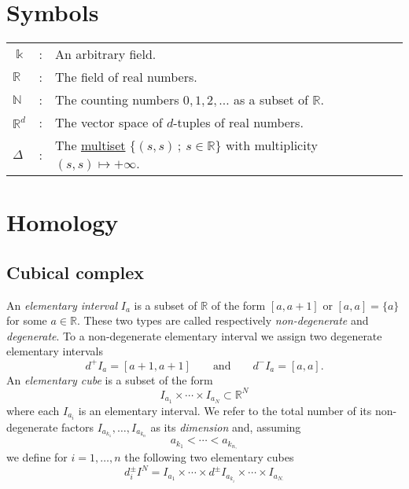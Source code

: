 \documentclass{amsart}
\begin{document}
	
	\section{Symbols}	
	
	\begin{tabular}{ l l l}
		$\Bbbk$ & : & An arbitrary field. \\
		$\mathbb R$ & : & The field of real numbers. \\
		$\mathbb N$ & : & The counting numbers $0,1,2, \ldots$ as a subset of $\mathbb R$. \\
		$\mathbb R^d$ & : & The vector space of $d$-tuples of real numbers. \\
		$\Delta$ & : & The \hyperref[multiset]{multiset} $\{(s,s)\,;\ s \in \mathbb R\}$ with multiplicity $(s,s) \mapsto +\infty$.
	\end{tabular}
	
	\section{Homology}
	
	\subsection*{Cubical complex} \label{cubical complex}
	
	An \textit{elementary interval} $I_a$ is a subset of $\mathbb{R}$ of the form $[a, a+1]$ or $[a,a] = \{a\}$ for some $a \in \mathbb{R}$. These two types are called respectively \textit{non-degenerate} and \textit{degenerate}. To a non-degenerate elementary interval we assign two degenerate elementary intervals
	\begin{equation*}
	d^+ I_a = [a+1, a+1] \qquad \text{and} \qquad d^- I_a = [a, a].
	\end{equation*}
	An \textit{elementary cube} is a subset of the form 
	\begin{equation*}
	I_{a_1} \times \cdots \times I_{a_N} \subset \mathbb{R}^N
	\end{equation*}
	where each $I_{a_i}$ is an elementary interval. We refer to the total number of its non-degenerate factors $I_{a_{k_1}}, \dots, I_{a_{k_n}}$ as its \textit{dimension} and, assuming
	\begin{equation*}
	a_{k_1} < \cdots < a_{k_{n,}}
	\end{equation*}
	we define for $i = 1, \dots, n$ the following two elementary cubes
	\begin{equation*}
	d_i^\pm I^N = I_{a_1} \times \cdots \times d^\pm I_{a_{k_i}} \times \cdots \times I_{a_{N.}}
	\end{equation*}
	
\end{document}
